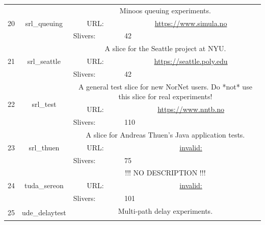 \begin{small}
\begin{center}
\begin{longtable}{|c|c|c|c|}
 \multirow{3}{*}{20} & \multirow{3}{*}{\index{srl\_queuing}\index{Slice!srl\_queuing}srl\_queuing} & \multicolumn{2}{|p{30em}|}{Minoos queuing experiments.} \\* \cline{3-3}\cline{4-4}
  &  & \multicolumn{1}{|p{5em}|}{URL:} & \multicolumn{1}{|p{22.5em}|}{\url{https://www.simula.no}} \\* \cline{3-3}\cline{4-4}
  &  & \multicolumn{1}{|l|}{Slivers:} & \multicolumn{1}{|l|}{42} \\ \hline
 \multirow{3}{*}{21} & \multirow{3}{*}{\index{srl\_seattle}\index{Slice!srl\_seattle}srl\_seattle} & \multicolumn{2}{|p{30em}|}{A slice for the Seattle project at NYU.} \\* \cline{3-3}\cline{4-4}
  &  & \multicolumn{1}{|p{5em}|}{URL:} & \multicolumn{1}{|p{22.5em}|}{\url{https://seattle.poly.edu}} \\* \cline{3-3}\cline{4-4}
  &  & \multicolumn{1}{|l|}{Slivers:} & \multicolumn{1}{|l|}{42} \\ \hline
 \multirow{3}{*}{22} & \multirow{3}{*}{\index{srl\_test}\index{Slice!srl\_test}srl\_test} & \multicolumn{2}{|p{30em}|}{A general test slice for new NorNet users. Do *not* use this slice for real experiments!} \\* \cline{3-3}\cline{4-4}
  &  & \multicolumn{1}{|p{5em}|}{URL:} & \multicolumn{1}{|p{22.5em}|}{\url{https://www.nntb.no}} \\* \cline{3-3}\cline{4-4}
  &  & \multicolumn{1}{|l|}{Slivers:} & \multicolumn{1}{|l|}{110} \\ \hline
 \multirow{3}{*}{23} & \multirow{3}{*}{\index{srl\_thuen}\index{Slice!srl\_thuen}srl\_thuen} & \multicolumn{2}{|p{30em}|}{A slice for Andreas Thuen's Java application tests.} \\* \cline{3-3}\cline{4-4}
  &  & \multicolumn{1}{|p{5em}|}{URL:} & \multicolumn{1}{|p{22.5em}|}{\url{invalid:}} \\* \cline{3-3}\cline{4-4}
  &  & \multicolumn{1}{|l|}{Slivers:} & \multicolumn{1}{|l|}{75} \\ \hline
 \multirow{3}{*}{24} & \multirow{3}{*}{\index{tuda\_sereon}\index{Slice!tuda\_sereon}tuda\_sereon} & \multicolumn{2}{|p{30em}|}{!!! NO DESCRIPTION !!!} \\* \cline{3-3}\cline{4-4}
  &  & \multicolumn{1}{|p{5em}|}{URL:} & \multicolumn{1}{|p{22.5em}|}{\url{invalid:}} \\* \cline{3-3}\cline{4-4}
  &  & \multicolumn{1}{|l|}{Slivers:} & \multicolumn{1}{|l|}{101} \\ \hline
 \multirow{3}{*}{25} & \multirow{3}{*}{\index{ude\_delaytest}\index{Slice!ude\_delaytest}ude\_delaytest} & \multicolumn{2}{|p{30em}|}{Multi-path delay experiments.} \\* \cline{3-3}\cline{4-4}

\end{longtable}
\end{center}
\end{small}
